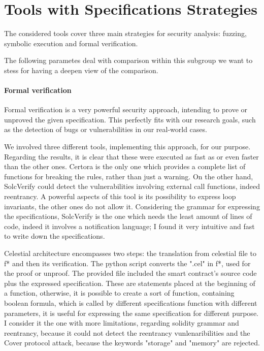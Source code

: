 \section{Tools with Specifications Strategies}
The considered tools cover three main strategies for security analysis: fuzzing, symbolic execution and formal verification. 



The following parametes deal with comparison within this subgroup we want to stess for having a deepen view of the comparison.

\paragraph{Formal verification} 
Formal verification is a very powerful security approach, intending to prove or unproved the given specification. 
This perfectly fits with our research goals, such as the detection of bugs or vulnerabilities in our real-world cases. 

We involved three different tools, implementing this approach, for our purpose. Regarding the results, it is clear that these were executed as fast as or even faster than the other ones. 
Certora is the only one which provides a complete list of functions for breaking the rules, rather than just a warning. 
On the other hand, SolcVerify could detect the vulnerabilities involving external call functions, indeed reentrancy. A powerful aspects of this tool is its possibility to express 
loop invariants, the other ones do not allow it.
Considering the grammar for expressing the specifications, SolcVerify is the one which needs the least amount of lines of code, indeed it involves a notification language; 
I found it very intuitive and fast to write down the specifications.

Celestial architecture encompasses two steps: the translation from celestial file to f* and then its verification. The python script converts the ".cel" in f*, used for the proof or unproof.
The provided file included the smart contract's source code plus the expressed specification. These are statements placed at the beginning of a function, otherwise, it is possible to create a sort of function, 
containing boolean formula, which is called by different specifications function with different parameters, it is useful for expressing the same specification for different purpose.  I consider it the one with more limitations, regarding solidity grammar and reentrancy, 
because it could not detect the reentrancy vunlenaribilities and the Cover protocol attack, because the keywords "storage" and "memory" are rejected. 

